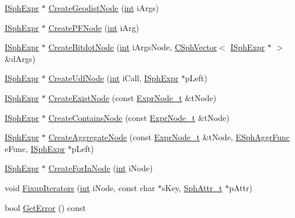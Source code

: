 \begin{DoxyCompactItemize}
\item 
\hyperlink{structISphExpr}{I\-Sph\-Expr} $\ast$ \hyperlink{classExprParser__t_a5eb12fad37be43e2fada325c83ca442f}{Create\-Geodist\-Node} (\hyperlink{sphinxexpr_8cpp_a4a26e8f9cb8b736e0c4cbf4d16de985e}{int} i\-Args)
\item 
\hyperlink{structISphExpr}{I\-Sph\-Expr} $\ast$ \hyperlink{classExprParser__t_a5535603f653a23ede68949998d579fa4}{Create\-P\-F\-Node} (\hyperlink{sphinxexpr_8cpp_a4a26e8f9cb8b736e0c4cbf4d16de985e}{int} i\-Arg)
\item 
\hyperlink{structISphExpr}{I\-Sph\-Expr} $\ast$ \hyperlink{classExprParser__t_a08957fb69602a2d98678bc9c1896ff94}{Create\-Bitdot\-Node} (\hyperlink{sphinxexpr_8cpp_a4a26e8f9cb8b736e0c4cbf4d16de985e}{int} i\-Args\-Node, \hyperlink{classCSphVector}{C\-Sph\-Vector}$<$ \hyperlink{structISphExpr}{I\-Sph\-Expr} $\ast$ $>$ \&d\-Args)
\item 
\hyperlink{structISphExpr}{I\-Sph\-Expr} $\ast$ \hyperlink{classExprParser__t_a2f9ac7f8690d716eff5f5f6a513b0199}{Create\-Udf\-Node} (\hyperlink{sphinxexpr_8cpp_a4a26e8f9cb8b736e0c4cbf4d16de985e}{int} i\-Call, \hyperlink{structISphExpr}{I\-Sph\-Expr} $\ast$p\-Left)
\item 
\hyperlink{structISphExpr}{I\-Sph\-Expr} $\ast$ \hyperlink{classExprParser__t_a791ce59c26f306f3061cde486f9a11a9}{Create\-Exist\-Node} (const \hyperlink{structExprNode__t}{Expr\-Node\-\_\-t} \&t\-Node)
\item 
\hyperlink{structISphExpr}{I\-Sph\-Expr} $\ast$ \hyperlink{classExprParser__t_a47c86358b8bba34d7319963fbe3a6fd6}{Create\-Contains\-Node} (const \hyperlink{structExprNode__t}{Expr\-Node\-\_\-t} \&t\-Node)
\item 
\hyperlink{structISphExpr}{I\-Sph\-Expr} $\ast$ \hyperlink{classExprParser__t_ab67be3bdaa7e4ec1adc4f4bb2a0a8ac3}{Create\-Aggregate\-Node} (const \hyperlink{structExprNode__t}{Expr\-Node\-\_\-t} \&t\-Node, \hyperlink{sphinx_8h_a92532037c3ec9dad4a636e957fff58c9}{E\-Sph\-Aggr\-Func} e\-Func, \hyperlink{structISphExpr}{I\-Sph\-Expr} $\ast$p\-Left)
\item 
\hyperlink{structISphExpr}{I\-Sph\-Expr} $\ast$ \hyperlink{classExprParser__t_ae04b1bccb7d9b69d64230678e728ee16}{Create\-For\-In\-Node} (\hyperlink{sphinxexpr_8cpp_a4a26e8f9cb8b736e0c4cbf4d16de985e}{int} i\-Node)
\item 
void \hyperlink{classExprParser__t_a98150e333e7bd11806adb101b82a1010}{Fixup\-Iterators} (\hyperlink{sphinxexpr_8cpp_a4a26e8f9cb8b736e0c4cbf4d16de985e}{int} i\-Node, const char $\ast$s\-Key, \hyperlink{sphinx_8h_a7c122d91b0b52a0214ba176636bb1561}{Sph\-Attr\-\_\-t} $\ast$p\-Attr)
\item 
bool \hyperlink{classExprParser__t_a7add5a1bde320a356a40f0747031d56c}{Get\-Error} () const 
\end{DoxyCompactItemize}
